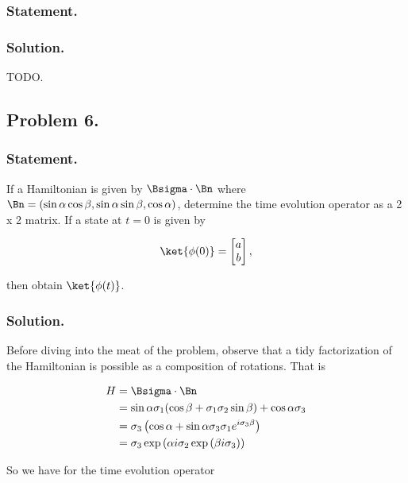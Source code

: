 \subsubsection{Statement.}
\subsubsection{Solution.}

TODO.

\subsection{Problem 6.}
\subsubsection{Statement.}

If a Hamiltonian is given by $\Bsigma \cdot \Bn$ where $\Bn = (\sin\alpha\cos\beta, \sin\alpha\sin\beta, \cos\alpha)$, determine the time evolution operator as a 2 x 2 matrix.  If a state at $t = 0$ is given by 

\begin{align}\label{eqn:desaiCh5:600}
\ket{\phi(0)} = 
\begin{bmatrix}
a \\
b
\end{bmatrix},
\end{align}

then obtain $\ket{\phi(t)}$.

\subsubsection{Solution.}

Before diving into the meat of the problem, observe that a tidy factorization of the Hamiltonian is possible as a composition of rotations.  That is

\begin{align*}
H 
&= \Bsigma \cdot \Bn \\
&= \sin\alpha \sigma_1 ( \cos\beta + \sigma_1 \sigma_2 \sin\beta ) + \cos\alpha \sigma_3 \\
&= \sigma_3 \left(
\cos\alpha 
+ \sin\alpha \sigma_3 \sigma_1 e^{ i \sigma_3 \beta }
\right) \\
&= 
\sigma_3 \exp\left( \alpha i \sigma_2 
\exp\left( \beta i \sigma_3 
\right)
\right)
\end{align*}

So we have for the time evolution operator

